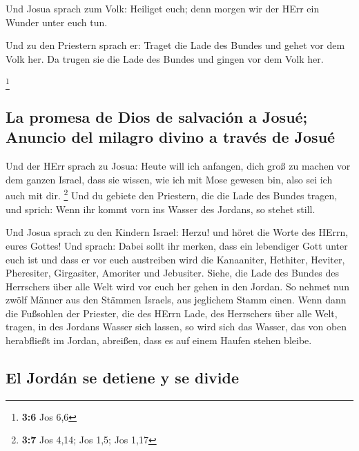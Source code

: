  Und Josua sprach zum Volk: Heiliget euch; denn morgen wir
der HErr ein Wunder unter euch tun.

 Und zu den Priestern sprach er: Traget die Lade des
Bundes und gehet vor dem Volk her. Da trugen sie die Lade des Bundes und
gingen vor dem Volk her.

\footnote{\textbf{3:6} Jos 6,6}

\hypertarget{la-promesa-de-dios-de-salvaciuxf3n-a-josuuxe9-anuncio-del-milagro-divino-a-travuxe9s-de-josuuxe9}{%
\subsection{La promesa de Dios de salvación a Josué; Anuncio del milagro
divino a través de
Josué}\label{la-promesa-de-dios-de-salvaciuxf3n-a-josuuxe9-anuncio-del-milagro-divino-a-travuxe9s-de-josuuxe9}}

 Und der HErr sprach zu Josua: Heute will ich anfangen,
dich groß zu machen vor dem ganzen Israel, dass sie wissen, wie ich mit
Mose gewesen bin, also sei ich auch mit dir. \footnote{\textbf{3:7} Jos
  4,14; Jos 1,5; Jos 1,17}  Und du gebiete den Priestern,
die die Lade des Bundes tragen, und sprich: Wenn ihr kommt vorn ins
Wasser des Jordans, so stehet still.

 Und Josua sprach zu den Kindern Israel: Herzu! und höret
die Worte des HErrn, eures Gottes!  Und sprach: Dabei
sollt ihr merken, dass ein lebendiger Gott unter euch ist und dass er
vor euch austreiben wird die Kanaaniter, Hethiter, Heviter, Pheresiter,
Girgasiter, Amoriter und Jebusiter.  Siehe, die Lade des
Bundes des Herrschers über alle Welt wird vor euch her gehen in den
Jordan.  So nehmet nun zwölf Männer aus den Stämmen
Israels, aus jeglichem Stamm einen.  Wenn dann die
Fußsohlen der Priester, die des HErrn Lade, des Herrschers über alle
Welt, tragen, in des Jordans Wasser sich lassen, so wird sich das
Wasser, das von oben herabfließt im Jordan, abreißen, dass es auf einem
Haufen stehen bleibe.

\hypertarget{el-jorduxe1n-se-detiene-y-se-divide}{%
\subsection{El Jordán se detiene y se
divide}\label{el-jorduxe1n-se-detiene-y-se-divide}}

